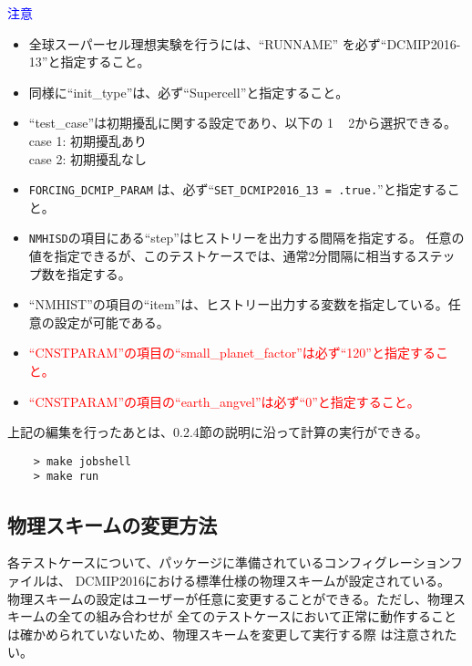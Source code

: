  \noindent \textcolor{blue}{{\sf 注意}}
 \begin{itemize}
   \item 全球スーパーセル理想実験を行うには、``RUNNAME'' を必ず``DCMIP2016-13''と指定すること。
   \item 同様に``init\_type''は、必ず``Supercell''と指定すること。
   \item ``test\_case''は初期擾乱に関する設定であり、以下の 1 ~ 2から選択できる。\\
          case 1: 初期擾乱あり \\
          case 2: 初期擾乱なし
   \item \verb|FORCING_DCMIP_PARAM| は、必ず``\verb|SET_DCMIP2016_13 = .true.|''と指定すること。
   \item \verb|NMHISD|の項目にある``step''はヒストリーを出力する間隔を指定する。
           任意の値を指定できるが、このテストケースでは、通常2分間隔に相当するステップ数を指定する。
   \item ``NMHIST''の項目の``item''は、ヒストリー出力する変数を指定している。任意の設定が可能である。
   \item \textcolor{red}{``CNSTPARAM''の項目の``small\_planet\_factor''は必ず``120''と指定すること。}
   \item \textcolor{red}{``CNSTPARAM''の項目の``earth\_angvel''は必ず``0''と指定すること。}
 \end{itemize}

 \noindent 上記の編集を行ったあとは、0.2.4節の説明に沿って計算の実行ができる。
 \begin{verbatim}
    > make jobshell
    > make run
 \end{verbatim}


\subsection{物理スキームの変更方法}

 \noindent 各テストケースについて、パッケージに準備されているコンフィグレーションファイルは、
DCMIP2016における標準仕様の物理スキームが設定されている。
物理スキームの設定はユーザーが任意に変更することができる。ただし、物理スキームの全ての組み合わせが
全てのテストケースにおいて正常に動作することは確かめられていないため、物理スキームを変更して実行する際
は注意されたい。\\



